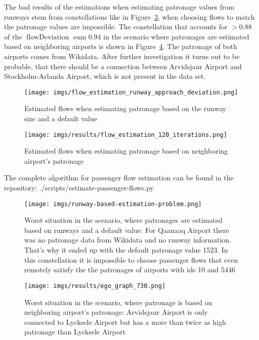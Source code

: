 \documentclass[twocolumn]{tum-article}
\DeclareMathOperator{\flowDeviation}{flowDeviation}
\begin{document}
The bad results of the estimations when estimating patronage values from runways stem from constellations like in Figure~\ref{fig:impossible_flows}, when choosing flows to match the patronage values are impossible. 
The constellation that accounts for $>0.88$ of the $\flowDeviation$ sum $0.94$ in the scenario where patronages are estimated based on neighboring airports is shown in Figure~\ref{fig:worst_flow_fit}. 
The patronage of both airports comes from Wikidata. After further investigation it turns out to be probable, that there should be a connection between Arvidsjaur Airport and Stockholm-Arlanda Airport, which is not present in the data set. 

\begin{figure}[h]
	\centering
	\texttt{[image: imgs/flow\_estimation\_runway\_approach\_deviation.png]}
	\caption{
Estimated flows when estimating patronage based on the runway size and a default value}
	\label{fig:flow_deviation_runway}
\end{figure}

\begin{figure}[h]
	\centering
	\texttt{[image: imgs/results/flow\_estimation\_120\_iterations.png]}
	\caption{
Estimated flows when estimating patronage based on neighboring airport's patronage}
	\label{fig:flow_deviation}
\end{figure}

The complete algorithm for passenger flow estimation can be found in the repository: ./scripts/estimate-passenger-flows.py

\begin{figure}[h]
	\centering
	\texttt{[image: imgs/runway-based-estimation-problem.png]}
	\caption{Worst situation in the scenario, where patronages are estimated based on runways and a default value: 
For Qaanaaq Airport there was no patronage data from Wikidata and no runway information. That's why it ended up with the default patronage value 1523. In this constellation it is impossible to choose passenger flows that even remotely satisfy the the patronages of airports with ids 10 and 5446}
	\label{fig:impossible_flows}
\end{figure}

\begin{figure}[h]
	\centering
	\texttt{[image: imgs/results/ego\_graph\_730.png]}
	\caption{Worst situation in the scenario, where patronage is based on neighboring airport's patronage: 
Arvidsjaur Airport is only connected to Lycksele Airport but has a more than twice as high patronage than Lycksele Airport}
	\label{fig:worst_flow_fit}
\end{figure}
\end{document}
